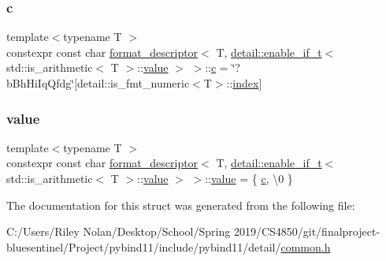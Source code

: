 \subsubsection{\texorpdfstring{c}{c}}
{\footnotesize\ttfamily template$<$typename T $>$ \\
constexpr const char \mbox{\hyperlink{structformat__descriptor}{format\+\_\+descriptor}}$<$ T, \mbox{\hyperlink{detail_2common_8h_a012819c9e8b5e04872a271f50f8b8196}{detail\+::enable\+\_\+if\+\_\+t}}$<$ std\+::is\+\_\+arithmetic$<$ T $>$\+::\mbox{\hyperlink{_s_d_l__opengl__glext_8h_a8ad81492d410ff2ac11f754f4042150f}{value}} $>$ $>$\+::\mbox{\hyperlink{_s_d_l__opengl__glext_8h_a1f2d7f8147412c43ba2303a56f97ee73}{c}} = \char`\"{}?b\+Bh\+Hi\+Iq\+Qfdg\char`\"{}\mbox{[}detail\+::is\+\_\+fmt\+\_\+numeric$<$T$>$\+::\mbox{\hyperlink{_s_d_l__opengl__glext_8h_a57f14e05b1900f16a2da82ade47d0c6d}{index}}\mbox{]}\hspace{0.3cm}{\ttfamily [static]}}

\mbox{\label{structformat__descriptor_3_01_t_00_01detail_1_1enable__if__t_3_01std_1_1is__arithmetic_3_01_t_01_4_1_1value_01_4_01_4_af96da013f06546698f219617697d849a}} 
\subsubsection{\texorpdfstring{value}{value}}
{\footnotesize\ttfamily template$<$typename T $>$ \\
constexpr const char \mbox{\hyperlink{structformat__descriptor}{format\+\_\+descriptor}}$<$ T, \mbox{\hyperlink{detail_2common_8h_a012819c9e8b5e04872a271f50f8b8196}{detail\+::enable\+\_\+if\+\_\+t}}$<$ std\+::is\+\_\+arithmetic$<$ T $>$\+::\mbox{\hyperlink{_s_d_l__opengl__glext_8h_a8ad81492d410ff2ac11f754f4042150f}{value}} $>$ $>$\+::\mbox{\hyperlink{_s_d_l__opengl__glext_8h_a8ad81492d410ff2ac11f754f4042150f}{value}} = \{ \mbox{\hyperlink{_s_d_l__opengl__glext_8h_a1f2d7f8147412c43ba2303a56f97ee73}{c}}, \textquotesingle{}\textbackslash{}0\textquotesingle{} \}\hspace{0.3cm}{\ttfamily [static]}}



The documentation for this struct was generated from the following file\+:\begin{DoxyCompactItemize}
\item 
C\+:/\+Users/\+Riley Nolan/\+Desktop/\+School/\+Spring 2019/\+C\+S4850/git/finalproject-\/bluesentinel/\+Project/pybind11/include/pybind11/detail/\mbox{\hyperlink{detail_2common_8h}{common.\+h}}\end{DoxyCompactItemize}
